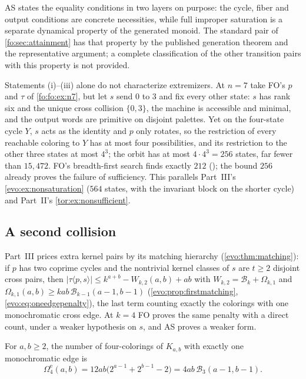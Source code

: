 \documentclass[11pt,a4paper]{article}
\numberwithin{equation}{section}
\theoremstyle{definition}
\theoremstyle{remark}
\newcommand{\Bip}{\mathcal B}
\begin{document}
AS states the equality conditions in two layers on purpose: the cycle, fiber
and output conditions are concrete necessities, while full improper
saturation is a separate dynamical property of the generated monoid. The
standard pair of \cref{fo:sec:attainment} has that property by the published
generation theorem and the representative argument; a complete
classification of the other transition pairs with this property is not
provided.

\begin{remark}\label{fo:fo:rem:notsufficient}
Statements (i)--(iii) alone do not characterize extremizers. At $n=7$ take
FO's $p$ and $\tau$ of \cref{fo:fo:ex:n7}, but let $s$ send $0$ to $3$ and fix
every other state: $s$ has rank six and the unique cross collision $\{0,3\}$,
the machine is accessible and minimal, and the output words are primitive on
disjoint palettes. Yet on the four-state cycle $Y$, $s$ acts as the identity
and $p$ only rotates, so the restriction of every reachable coloring to $Y$
has at most four possibilities, and its restriction to the other three states
at most $4^3$; the orbit has at most $4\cdot4^3=256$ states, far fewer than
$15{,}472$. FO's breadth-first search finds exactly $212$
(); the bound $256$ already proves the
failure of sufficiency. This parallels Part~III's
\cref{evo:ex:nonsaturation} ($564$ states, with the invariant block on the
shorter cycle) and Part~II's \cref{tor:ex:nonsufficient}.
\end{remark}

\subsection{A second collision}\label{fo:sec:penalty}

Part~III prices extra kernel pairs by its matching hierarchy
(\cref{evo:thm:matching}): if $p$ has two coprime cycles and the nontrivial
kernel classes of $s$ are $t\ge2$ disjoint cross pairs, then
$|\tau\langle p,s\rangle|\le k^{a+b}-W_{k,2}(a,b)+ab$ with
$W_{k,2}=\Bip_k+\Omega_{k,1}$ and $\Omega_{k,1}(a,b)\ge kab\,\Bip_{k-1}(a-1,b-1)$
(\cref{evo:prop:firstmatching}, \eqref{evo:eq:oneedgepenalty}), the last term
counting exactly the colorings with one monochromatic cross edge. At $k=4$ FO
proves the same penalty with a direct count, under a weaker hypothesis on $s$,
and AS proves a weaker form.

\begin{lemma}\label{fo:fo:lem:oneedge}
For $a,b\ge2$, the number of four-colorings of $K_{a,b}$ with exactly one
monochromatic edge is
\begin{equation}\label{fo:fo:eq:oneedge}
 \Omega^{\mathrm e}_4(a,b)=12ab\bigl(2^{a-1}+2^{b-1}-2\bigr)=4ab\,\Bip_3(a-1,b-1).
\end{equation}
\end{lemma}
\end{document}
